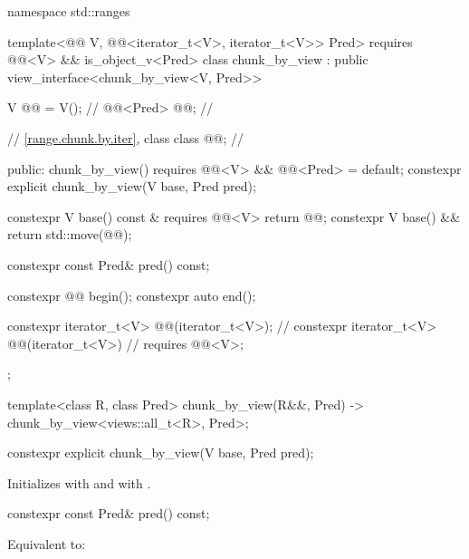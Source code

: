 \begin{codeblock}
namespace std::ranges {
  template<@@ V, @@<iterator_t<V>, iterator_t<V>> Pred>
    requires @@<V> && is_object_v<Pred>
  class chunk_by_view : public view_interface<chunk_by_view<V, Pred>> {
    V @@ = V();                                          // \expos
    @@<Pred> @@;                                // \expos

    // \ref{range.chunk.by.iter}, class 
    class @@;                                         // \expos

  public:
    chunk_by_view() requires @@<V> && @@<Pred> = default;
    constexpr explicit chunk_by_view(V base, Pred pred);

    constexpr V base() const & requires @@<V> { return @@; }
    constexpr V base() && { return std::move(@@); }

    constexpr const Pred& pred() const;

    constexpr @@ begin();
    constexpr auto end();

    constexpr iterator_t<V> @@(iterator_t<V>);       // \expos
    constexpr iterator_t<V> @@(iterator_t<V>)        // \expos
      requires @@<V>;
  };

  template<class R, class Pred>
    chunk_by_view(R&&, Pred) -> chunk_by_view<views::all_t<R>, Pred>;
}
\end{codeblock}

\begin{itemdecl}
constexpr explicit chunk_by_view(V base, Pred pred);
\end{itemdecl}

\begin{itemdescr}
\pnum
\effects
Initializes  with  and
 with .
\end{itemdescr}

%
\begin{itemdecl}
constexpr const Pred& pred() const;
\end{itemdecl}

\begin{itemdescr}
\pnum
\effects
Equivalent to: 
\end{itemdescr}

